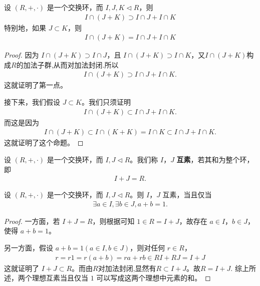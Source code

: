 \documentclass[../../main.tex]{subfiles}
\begin{document}
\begin{proposition}
设 $(R, +, \cdot)$ 是一个交换环，而 $I, J, K \lhd R$，则
\begin{align*}
I \cap (J + K) \supset I \cap J + I \cap K
\end{align*}
特别地，如果 $J \subset K$，则
\begin{align*}
I \cap (J + K) = I \cap J + I \cap K
\end{align*}
\end{proposition}
\begin{proof}
因为 $I \cap (J + K) \supset I \cap J$，且 $I \cap (J + K) \supset I \cap K$，又$I \cap (J + K)$构成$R$的加法子群,从而对加法封闭.所以
\begin{align*}
I \cap (J + K) \supset I \cap J + I \cap K.
\end{align*}
这就证明了第一点。

接下来，我们假设 $J \subset K$。我们只须证明
\begin{align*}
I \cap (J + K) \subset I \cap J + I \cap K.
\end{align*}
而这是因为
\begin{align*}
I \cap (J + K) \subset I \cap (K + K) = I \cap K \subset I \cap J + I \cap K.
\end{align*}
这就证明了这个命题。 

\end{proof}

\begin{definition}[理想的互素]
设 $(R, +, \cdot)$ 是一个交换环，而 $I, J \lhd R$。我们称 $I$，$J$ \textbf{互素}，若其和为整个环，即
\begin{align*}
I + J = R.
\end{align*}
\end{definition}

\begin{proposition}[两个理想互素的充要条件]\label{proposition:两个理想互素的充要条件}
设 $(R, +, \cdot)$ 是一个交换环，而 $I, J \lhd R$。则 $I$，$J$ 互素，当且仅当
\begin{align*}
\exists a \in I, \exists b \in J, a + b = 1.
\end{align*}
\end{proposition}
\begin{proof}
一方面，若 $I + J = R$，则根据可知 $1 \in R = I + J$，故存在 $a \in I$，$b \in J$，使得 $a + b = 1$。

另一方面，假设 $a + b = 1 (a \in I, b \in J)$，则对任何 $r \in R$，
\begin{align*}
r = r1 = r(a + b) = ra + rb \in RI + RJ = I + J
\end{align*}
这就证明了 $I + J \subset R$。而由$R$对加法封闭,显然有$R\subset I+J$。故$R=I+J.$
综上所述，两个理想互素当且仅当 $1$ 可以写成这两个理想中元素的和。

\end{proof}
\end{document}
